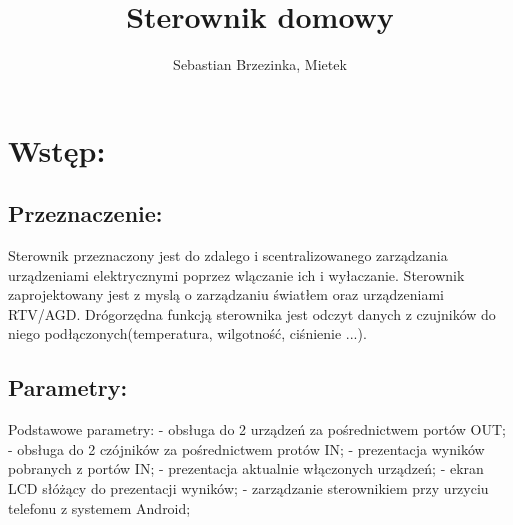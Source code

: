 \documentclass[11pt,a4paper]{article}
\title{Sterownik domowy}
\author{Sebastian Brzezinka, Mietek}
\date{}
\begin{document}
	\maketitle
	\pagebreak
	\section{Wstęp:}
	\subsection{Przeznaczenie:} 
	Sterownik przeznaczony jest do zdalego i scentralizowanego zarządzania urządzeniami elektrycznymi poprzez wlączanie ich i wyłaczanie. 
	Sterownik zaprojektowany jest z myslą o zarządzaniu światłem oraz urządzeniami RTV/AGD. 
	Drógorzędna funkcją sterownika jest odczyt danych z czujników do niego podłączonych(temperatura, wilgotność, ciśnienie ...).
	\subsection{Parametry:}
	Podstawowe parametry:\newline 
	- obsługa do 2 urządzeń za pośrednictwem portów OUT;\newline
	- obsługa do 2 czójników za pośrednictwem protów IN;\newline
	- prezentacja wyników pobranych z portów IN;\newline
	- prezentacja aktualnie włączonych urządzeń;\newline
	- ekran LCD słóżący do prezentacji wyników; \newline 
	- zarządzanie sterownikiem przy urzyciu telefonu z systemem Android;\newline
\end{document}
